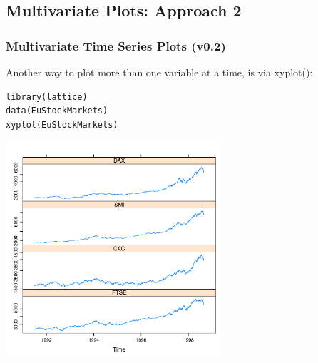 \subsection{Multivariate Plots: Approach 2}
\begin{frame}
 \frametitle{Multivariate Time Series Plots (v0.2)}

Another way to plot more than one variable at a time, is via \ttfamily xyplot()\normalfont :

    \begin{lstlisting}
library(lattice) 
data(EuStockMarkets)
xyplot(EuStockMarkets)
   \end{lstlisting}


       \begin{center}
         \includegraphics[width=0.6\textwidth]{images/stockPlot0.pdf}
        \end{center}
\end{frame}

